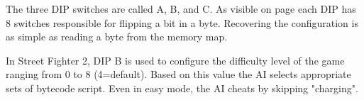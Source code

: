 The three DIP switches are called A, B, and C. As visible on page \pageref{fig:boarda} each DIP has 8 switches responsible for flipping a bit in a byte. Recovering the configuration is as simple as reading a byte from the memory map.

\begin{trivia}
In Street Fighter 2, DIP B is used to configure the difficulty level of the game ranging from 0 to 8 (4=default). Based on this value the AI selects appropriate sets of bytecode\cite{sf2aiengine} script. Even in easy mode, the AI cheats by skipping "charging"\cite{sf2aiengine}.
\end{trivia}



